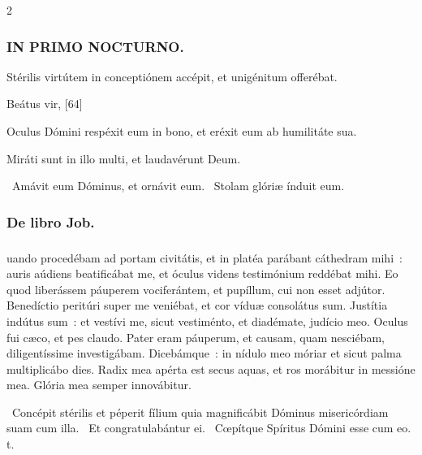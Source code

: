 \documentclass[9pt,twoside]{extarticle}
\begin{document}
\begin{multicols}{2}
{\subsubsection*{\center \textsc{IN PRIMO NOCTURNO.}}
\begin{tightlist}{}
\item {} Stérilis virtútem in conceptiónem accépit, et unigénitum offerébat.
\item {} Beátus vir,  [64]
\item {} Oculus Dómini respéxit eum in bono, et eréxit eum ab humilitáte sua.
\item {} Miráti sunt in illo multi, et laudavérunt Deum.
\item {}~Amávit eum Dóminus, et ornávit eum. ~Stolam glóriæ índuit eum.
\item {}
\end{tightlist}

\subsubsection*{\center De libro Job.}
\subsubsection*{\center {}}
uando procedébam ad portam civitátis, et in platéa parábant cáthedram mihi~: auris aúdiens beatificábat me, et óculus videns testimónium reddébat mihi. Eo quod liberássem páuperem vociferántem, et pupíllum, cui non esset adjútor. Benedíctio peritúri super me veniébat, et cor víduæ consolátus sum. Justítia indútus sum~: et vestívi me, sicut vestiménto, et diadémate, judício meo. Oculus fui cæco, et pes claudo. Pater eram páuperum, et causam, quam nesciébam, diligentíssime investigábam. Dicebámque~: in nídulo meo móriar et sicut palma multiplicábo dies. Radix mea apérta est secus aquas, et ros morábitur in messióne mea. Glória mea semper innovábitur.

\begin{tightlist}{}
\item {}~Concépit stérilis et péperit fílium quia magnificábit Dóminus misericórdiam suam cum illa. \textred{*}~Et congratulabántur ei. ~Cœpítque Spíritus Dómini esse cum eo. t.
\end{tightlist}

}
\end{multicols}
\end{document}

